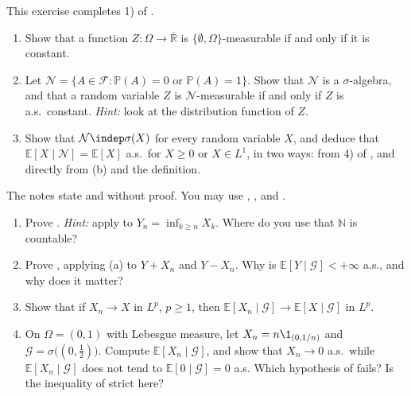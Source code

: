 
\begin{exercise}\label{ex:cp-trivial}
\easy This exercise completes 1) of .
\begin{enumerate}[label=(\alph*)]
  \item Show that a function $Z:\Omega\to\overline{\mathbb R}$ is $\{\emptyset,\Omega\}$-measurable if
    and only if it is constant.
  \item Let $\mathcal N=\{A\in\mathcal F:\mathbb P(A)=0\text{ or }\mathbb P(A)=1\}$. Show that
    $\mathcal N$ is a $\sigma$-algebra, and that a random variable $Z$ is $\mathcal N$-measurable if
    and only if $Z$ is a.s.\ constant. \emph{Hint:} look at the distribution function of $Z$.
  \item Show that $\mathcal N\indep\sigma(X)$ for every random variable $X$, and deduce that
    $\mathbb E[X\mid\mathcal N]=\mathbb E[X]$ a.s.\ for $X\ge0$ or $X\in L^1$, in two ways: from 4)
    of , and directly from (b) and the definition.
\end{enumerate}
\end{exercise}

\begin{exercise}\label{ex:cp-convergence}
\medium The notes state  and  without
proof. You may use , ,
 and .
\begin{enumerate}[label=(\alph*)]
  \item Prove . \emph{Hint:} apply  to
    $Y_n=\inf_{k\ge n}X_k$. Where do you use that $\mathbb N$ is countable?
  \item Prove , applying (a) to $Y+X_n$ and $Y-X_n$. Why is
    $\mathbb E[Y\mid\mathcal G]<+\infty$ a.s., and why does it matter?
  \item Show that if $X_n\to X$ in $L^p$, $p\ge1$, then $\mathbb E[X_n\mid\mathcal G]\to\mathbb E[X\mid\mathcal G]$
    in $L^p$.
  \item On $\Omega=(0,1)$ with Lebesgue measure, let $X_n=n\1_{(0,1/n)}$ and
    $\mathcal G=\sigma\big((0,\frac12)\big)$. Compute $\mathbb E[X_n\mid\mathcal G]$, and show that
    $X_n\to0$ a.s.\ while $\mathbb E[X_n\mid\mathcal G]$ does not tend to $\mathbb E[0\mid\mathcal G]=0$
    a.s. Which hypothesis of  fails? Is the inequality of
     strict here?
\end{enumerate}
\end{exercise}

